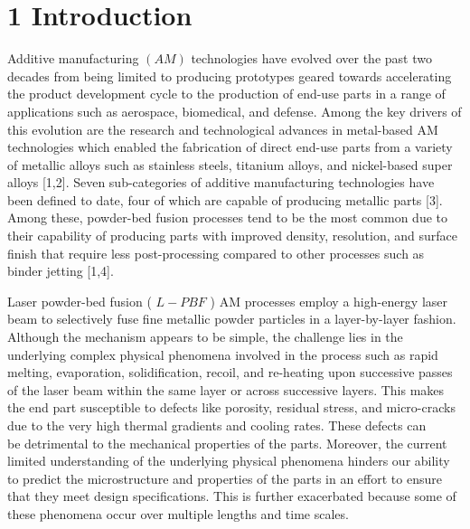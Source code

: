 \documentclass[10pt]{article}
\begin{document}
\section*{1 Introduction}
Additive manufacturing $(A M)$ technologies have evolved over the past two decades from being limited to producing prototypes geared towards accelerating the product development cycle to the production of end-use parts in a range of applications such as aerospace, biomedical, and defense. Among the key drivers of this evolution are the research and technological advances in metal-based AM technologies which enabled the fabrication of direct end-use parts from a variety of metallic alloys such as stainless steels, titanium alloys, and nickel-based super alloys [1,2]. Seven sub-categories of additive manufacturing technologies have been defined to date, four of which are capable of producing metallic parts [3]. Among these, powder-bed fusion processes tend to be the most common due to their capability of producing parts with improved density, resolution, and surface finish that require less post-processing compared to other processes such as binder jetting [1,4].

Laser powder-bed fusion ( $L-P B F$ ) AM processes employ a high-energy laser beam to selectively fuse fine metallic powder particles in a layer-by-layer fashion. Although the mechanism appears to be simple, the challenge lies in the underlying complex physical phenomena involved in the process such as rapid melting, evaporation, solidification, recoil, and re-heating upon successive passes of the laser beam within the same layer or across successive layers. This makes the end part susceptible to defects like porosity, residual stress, and micro-cracks due to the very high thermal gradients and cooling rates. These defects can\\
be detrimental to the mechanical properties of the parts. Moreover, the current limited understanding of the underlying physical phenomena hinders our ability to predict the microstructure and properties of the parts in an effort to ensure that they meet design specifications. This is further exacerbated because some of these phenomena occur over multiple lengths and time scales.
\end{document}

